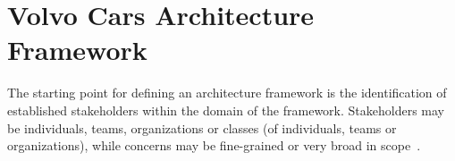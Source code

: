 
\section{Volvo Cars Architecture Framework}\label{sec:VCGAF}

The starting point for defining an architecture framework is  the identification of established stakeholders within the domain of the framework. Stakeholders may be individuals, teams,
organizations or classes (of individuals, teams or organizations), while concerns may be fine-grained or very broad in scope~\cite{Emery-Hilliard:2009}. 




